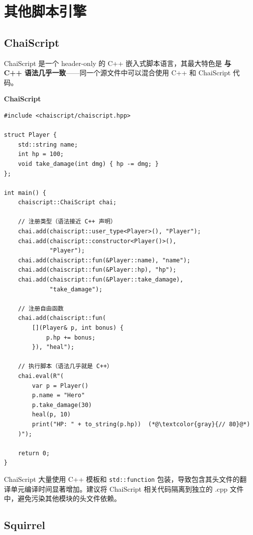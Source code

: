 \documentclass[12pt,a4paper,fontset=fandol]{ctexbook}
\newenvironment{note}[1][]{%
  \begin{tcolorbox}[enhanced,breakable,
    colback=orange!5!white,colframe=orange!80!black,
    boxed title style={colback=orange!80!black},
    attach boxed title to top left={yshift=-2mm,xshift=2mm},
    arc=2mm,boxrule=0.8mm,
    title={注意},#1]}%
  {\end{tcolorbox}}
\newcommand{\Tp}[1]{\texttt{#1}}
\newcommand{\chaiscriptlabel}{%
  \noindent\begin{tcolorbox}[colback=chaibg,coltext=white,
    sharp corners,boxrule=0pt,width=6.0em,height=1.4em,
    halign=center,valign=center,nobeforeafter,left=0pt,right=0pt,
    top=0pt,bottom=0pt]\small\bfseries ChaiScript\end{tcolorbox}}
\begin{document}
\chapter{其他脚本引擎}\label{ch:others}

\section{ChaiScript}\label{sec:chaiscript}

ChaiScript 是一个 header-only 的 C++ 嵌入式脚本语言，其最大特色是 \textbf{与 C++ 语法几乎一致}——同一个源文件中可以混合使用 C++ 和 ChaiScript 代码。

\chaiscriptlabel
\begin{lstlisting}[style=cppstyle]
#include <chaiscript/chaiscript.hpp>

struct Player {
    std::string name;
    int hp = 100;
    void take_damage(int dmg) { hp -= dmg; }
};

int main() {
    chaiscript::ChaiScript chai;

    // 注册类型（语法接近 C++ 声明）
    chai.add(chaiscript::user_type<Player>(), "Player");
    chai.add(chaiscript::constructor<Player()>(),
             "Player");
    chai.add(chaiscript::fun(&Player::name), "name");
    chai.add(chaiscript::fun(&Player::hp), "hp");
    chai.add(chaiscript::fun(&Player::take_damage),
             "take_damage");

    // 注册自由函数
    chai.add(chaiscript::fun(
        [](Player& p, int bonus) {
            p.hp += bonus;
        }), "heal");

    // 执行脚本（语法几乎就是 C++）
    chai.eval(R"(
        var p = Player()
        p.name = "Hero"
        p.take_damage(30)
        heal(p, 10)
        print("HP: " + to_string(p.hp))  (*@\textcolor{gray}{// 80}@*)
    )");

    return 0;
}
\end{lstlisting}

\begin{note}[title={ChaiScript 的编译代价}]
ChaiScript 大量使用 C++ 模板和 \Tp{std::function} 包装，导致包含其头文件的翻译单元编译时间显著增加。建议将 ChaiScript 相关代码隔离到独立的 .cpp 文件中，避免污染其他模块的头文件依赖。
\end{note}

\section{Squirrel}\label{sec:squirrel}
\end{document}
